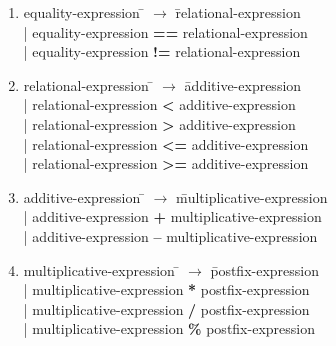 \documentclass[12pt]{article}
\begin{document}
\begin{enumerate}
\item \begin{tabbing} equality-expression \= $\rightarrow$ \= relational-expression \\
	\> \hspace*{0.05cm} | \> equality-expression \textbf{==} relational-expression \\
	\> \hspace*{0.05cm} | \> equality-expression \textbf{!=} relational-expression
\end{tabbing}

\item \begin{tabbing} relational-expression \= $\rightarrow$ \= additive-expression \\
	\> \hspace*{0.05cm} | \> relational-expression \textbf{<}   additive-expression \\
	\> \hspace*{0.05cm} | \> relational-expression \textbf{>}   additive-expression \\
	\> \hspace*{0.05cm} | \> relational-expression \textbf{<=} additive-expression \\
	\> \hspace*{0.05cm} | \> relational-expression \textbf{>=} additive-expression
\end{tabbing}

\item \begin{tabbing} additive-expression \= $\rightarrow$ \= multiplicative-expression \\
	\> \hspace*{0.05cm} | \> additive-expression \textbf{+} multiplicative-expression \\
	\> \hspace*{0.05cm} | \> additive-expression \textbf{--} multiplicative-expression
\end{tabbing}

\item \begin{tabbing} multiplicative-expression \= $\rightarrow$ \= postfix-expression \\
	\> \hspace*{0.05cm} | \> multiplicative-expression \textbf{*} postfix-expression \\
	\> \hspace*{0.05cm} | \> multiplicative-expression \textbf{/} postfix-expression \\
	\> \hspace*{0.05cm} | \> multiplicative-expression \textbf{\%} postfix-expression
\end{tabbing}


\end{enumerate}
\end{document}
